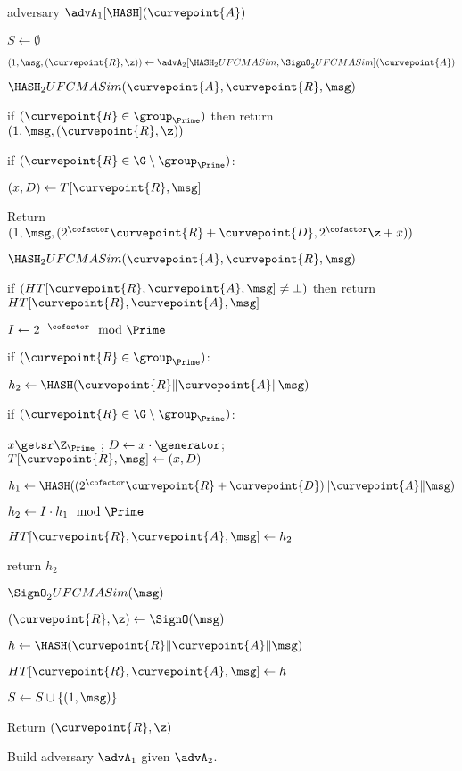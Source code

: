 	\begin{figure}
	{	
		\begin{algorithm-initial}{adversary $\advA_1[\HASH](\curvepoint{A})$}
			\item $S \gets \emptyset$
			\item $(1, \msg, (\curvepoint{R}, \z)) \gets \advA_2[\HASH_2UFCMASim, \SignO_2 UFCMASim](\curvepoint{A})$
			\item $\HASH_2UFCMASim(\curvepoint{A}, \curvepoint{R},  \msg)$
			\item if $(\curvepoint{R} \in \group_{\Prime})$ then return $(1, \msg, (\curvepoint{R}, \z))$
			\item if $(\curvepoint{R} \in \G \setminus \group_{\Prime})$:
			\item \quad $(x, D) \gets T[\curvepoint{R}, \msg]$
			\item Return $(1, \msg, (2^\cofactor\curvepoint{R} + \curvepoint{D}, 2^\cofactor\z + x))$
		\end{algorithm-initial}  \vspace{2pt}
		\begin{algorithm-subsequent}{$\HASH_2UFCMASim(\curvepoint{A}, \curvepoint{R},  \msg)$}
			\item if $(HT[\curvepoint{R}, \curvepoint{A}, \msg] \neq \bot)$ then return $HT[\curvepoint{R}, \curvepoint{A}, \msg]$
			\item $I \gets 2^{-\cofactor} \mod \Prime$
			\item if $(\curvepoint{R} \in \group_{\Prime})$:
			\item \quad $h_2 \gets \HASH(\curvepoint{R}\|\curvepoint{A}\| \msg)$
			\item if $(\curvepoint{R} \in \G \setminus \group_{\Prime})$:
			\item \quad $x \getsr \Z_{\Prime}$ ; $D \gets x \cdot \generator$; $T[\curvepoint{R}, \msg] \gets (x, D)$
			\item \quad $h_1 \gets \HASH((2^\cofactor\curvepoint{R} + \curvepoint{D}) \|\curvepoint{A}\| \msg)$
			\item \quad $h_2 \gets I \cdot h_1 \mod \Prime$
			\item $HT[\curvepoint{R}, \curvepoint{A}, \msg] \gets h_2$
			\item return $h_2$
		\end{algorithm-subsequent}  
		\begin{algorithm-subsequent}{$\SignO_2 UFCMASim(\msg)$}
			\item $(\curvepoint{R}, \z) \gets \SignO(\msg)$
			\item $h \gets \HASH(\curvepoint{R}\|\curvepoint{A}\| \msg)$
			\item $HT[\curvepoint{R}, \curvepoint{A}, \msg] \gets h$
			\item $S \gets S \cup \{(1, \msg)\}$
			\item Return $(\curvepoint{R}, \z)$
		\end{algorithm-subsequent} 
	}
	\vspace{-5pt}
	\caption{Build adversary $\advA_1$ given $\advA_2$.}
	\label{fig:A1}
	\hrulefill
	\vspace{-10pt}
\end{figure}


 



